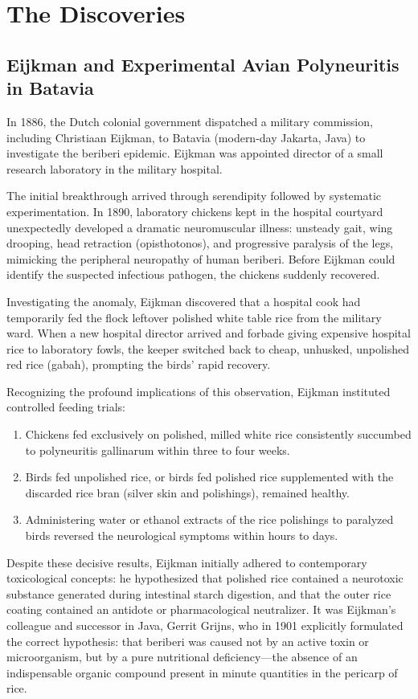 \section{The Discoveries}

\subsection{Eijkman and Experimental Avian Polyneuritis in Batavia}

In 1886, the Dutch colonial government dispatched a military commission, including Christiaan Eijkman, to Batavia (modern-day Jakarta, Java) to investigate the beriberi epidemic. Eijkman was appointed director of a small research laboratory in the military hospital.

The initial breakthrough arrived through serendipity followed by systematic experimentation. In 1890, laboratory chickens kept in the hospital courtyard unexpectedly developed a dramatic neuromuscular illness: unsteady gait, wing drooping, head retraction (opisthotonos), and progressive paralysis of the legs, mimicking the peripheral neuropathy of human beriberi. Before Eijkman could identify the suspected infectious pathogen, the chickens suddenly recovered. 

Investigating the anomaly, Eijkman discovered that a hospital cook had temporarily fed the flock leftover polished white table rice from the military ward. When a new hospital director arrived and forbade giving expensive hospital rice to laboratory fowls, the keeper switched back to cheap, unhusked, unpolished red rice (gabah), prompting the birds' rapid recovery.

Recognizing the profound implications of this observation, Eijkman instituted controlled feeding trials:
\begin{enumerate}
    \item Chickens fed exclusively on polished, milled white rice consistently succumbed to polyneuritis gallinarum within three to four weeks.
    \item Birds fed unpolished rice, or birds fed polished rice supplemented with the discarded rice bran (silver skin and polishings), remained healthy.
    \item Administering water or ethanol extracts of the rice polishings to paralyzed birds reversed the neurological symptoms within hours to days.
\end{enumerate}

Despite these decisive results, Eijkman initially adhered to contemporary toxicological concepts: he hypothesized that polished rice contained a neurotoxic substance generated during intestinal starch digestion, and that the outer rice coating contained an antidote or pharmacological neutralizer. It was Eijkman's colleague and successor in Java, Gerrit Grijns, who in 1901 explicitly formulated the correct hypothesis: that beriberi was caused not by an active toxin or microorganism, but by a pure nutritional deficiency—the absence of an indispensable organic compound present in minute quantities in the pericarp of rice.

